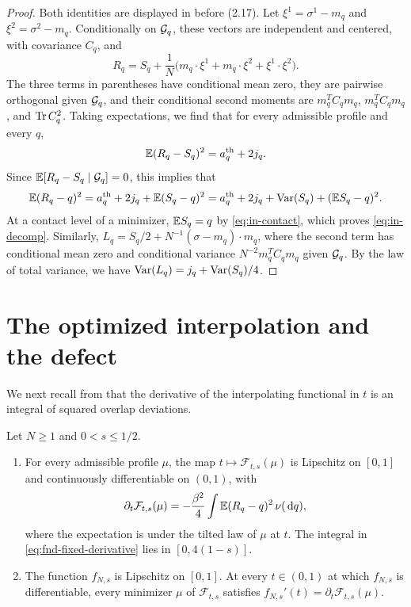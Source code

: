 \begin{proof}
Both identities are displayed in \cite[Section~2.5]{AL} before (2.17).
Let $\xi^1=\sigma^1-m_q$ and $\xi^2=\sigma^2-m_q$. Conditionally on
$\mathcal G_q$, these vectors are independent and centered, with covariance
$C_q$, and
\[
 R_q=S_q+\frac1N\bigl(m_q\cdot\xi^1+m_q\cdot\xi^2+\xi^1\cdot\xi^2\bigr).
\]
The three terms in parentheses have conditional mean zero, they are
pairwise orthogonal given $\mathcal G_q$, and their conditional second moments
are $m_q^TC_qm_q$, $m_q^TC_qm_q$, and $\operatorname{Tr} C_q^2$. Taking expectations, we
find that for every admissible profile and every $q$,
\begin{equation}\label{eq:fnd-RS}
 \mathbb E(R_q-S_q)^2=a_q^{\rm th}+2j_q .
\end{equation}
Since $\mathbb E[R_q-S_q\mid\mathcal G_q]=0$, this implies that
\[
 \mathbb E(R_q-q)^2=a_q^{\rm th}+2j_q+\mathbb E(S_q-q)^2
 =a_q^{\rm th}+2j_q+\operatorname{Var}(S_q)+(\mathbb E S_q-q)^2 .
\]
At a contact level of a minimizer, $\mathbb E S_q=q$ by \eqref{eq:in-contact},
which proves \eqref{eq:in-decomp}. Similarly,
$L_q=S_q/2+N^{-1}(\sigma-m_q)\cdot m_q$, where the second term has
conditional mean zero and conditional variance $N^{-2}m_q^TC_qm_q$ given
$\mathcal G_q$. By the law of total variance, we have $\operatorname{Var}(L_q)=j_q+\operatorname{Var}(S_q)/4$.
\end{proof}

\section{The optimized interpolation and the defect}
\label{sec:fnd-defect}

We next recall from \cite[Proposition~2.3]{AL} that the derivative of the
interpolating functional in $t$ is an integral of squared overlap
deviations.

\begin{proposition}\label{prop:fnd-interpolation}
Let $N\ge1$ and $0<s\le1/2$.
\begin{enumerate}[label=(\alph*)]
\item For every admissible profile $\mu$, the map
$t\mapsto\mathcal F_{t,s}(\mu)$ is Lipschitz on $[0,1]$ and continuously
differentiable on $(0,1)$, with
\begin{equation}\label{eq:fnd-fixed-derivative}
 \partial_t\mathcal F_{t,s}(\mu)
   =-\frac{\beta^2}4\int\mathbb E(R_q-q)^2\,\nu(\,\mathrm d q),
\end{equation}
where the expectation is under the tilted law of $\mu$ at $t$. The
integral in \eqref{eq:fnd-fixed-derivative} lies in $[0,4(1-s)]$.
\item The function $f_{N,s}$ is Lipschitz on $[0,1]$. At every
$t\in(0,1)$ at which $f_{N,s}$ is differentiable, every minimizer $\mu$
of $\mathcal F_{t,s}$ satisfies
$f_{N,s}'(t)=\partial_t\mathcal F_{t,s}(\mu)$.
\end{enumerate}
\end{proposition}

